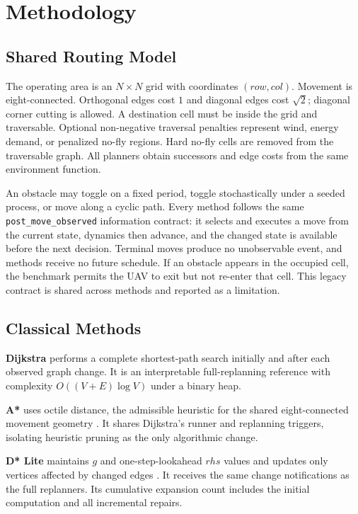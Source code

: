 \section{Methodology}
\label{sec:methodology}

\subsection{Shared Routing Model}

The operating area is an $N\times N$ grid with coordinates $(row,col)$.
Movement is eight-connected. Orthogonal edges cost $1$ and diagonal edges cost
$\sqrt{2}$; diagonal corner cutting is allowed. A destination cell must be
inside the grid and traversable. Optional non-negative traversal penalties
represent wind, energy demand, or penalized no-fly regions. Hard no-fly cells
are removed from the traversable graph. All planners obtain successors and
edge costs from the same environment function.

An obstacle may toggle on a fixed period, toggle stochastically under a seeded
process, or move along a cyclic path. Every method follows the same
\texttt{post\_move\_observed} information contract: it selects and executes a
move from the current state, dynamics then advance, and the changed state is
available before the next decision. Terminal moves produce no unobservable
event, and methods receive no future schedule. If an obstacle appears in the
occupied cell, the benchmark permits the UAV to exit but not re-enter that
cell. This legacy contract is shared across methods and reported as a
limitation.

\subsection{Classical Methods}

\textbf{Dijkstra} performs a complete shortest-path search initially and after
each observed graph change. It is an interpretable full-replanning reference
with complexity $O((V+E)\log V)$ under a binary heap.

\textbf{A*} uses octile distance, the admissible heuristic for the shared
eight-connected movement geometry \cite{hart1968astar}. It shares Dijkstra's
runner and replanning triggers, isolating heuristic pruning as the only
algorithmic change.

\textbf{D* Lite} maintains $g$ and one-step-lookahead $rhs$ values and updates
only vertices affected by changed edges \cite{koenig2005dstarlite}. It receives
the same change notifications as the full replanners. Its cumulative expansion
count includes the initial computation and all incremental repairs.

